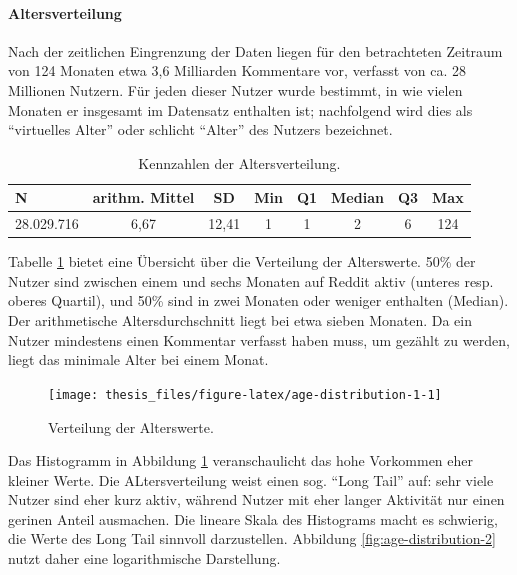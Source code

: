 \documentclass[11pt,a4paper,twoside]{article}
\let\oldpar\paragraph
\renewcommand{\paragraph}{\oldpar*}
\begin{document}
\hypertarget{altersverteilung}{%
\paragraph{Altersverteilung}\label{altersverteilung}}

Nach der zeitlichen Eingrenzung der Daten liegen für den betrachteten
Zeitraum von 124 Monaten etwa 3,6 Milliarden Kommentare vor, verfasst
von ca. 28 Millionen Nutzern. Für jeden dieser Nutzer wurde bestimmt, in
wie vielen Monaten er insgesamt im Datensatz enthalten ist; nachfolgend
wird dies als \enquote{virtuelles Alter} oder schlicht \enquote{Alter}
des Nutzers bezeichnet.



\begin{table}

\caption{\label{tab:summary-age-tab}Kennzahlen der Altersverteilung.}
\centering
\begin{tabular}[t]{lccccccc}
\toprule
N & arithm. Mittel & SD & Min & Q1 & Median & Q3 & Max\\
\midrule
28.029.716 & 6,67 & 12,41 & 1 & 1 & 2 & 6 & 124\\
\bottomrule
\end{tabular}
\end{table}

Tabelle \ref{tab:summary-age-tab} bietet eine Übersicht über die
Verteilung der Alterswerte. 50\% der Nutzer sind zwischen einem und
sechs Monaten auf Reddit aktiv (unteres resp. oberes Quartil), und 50\%
sind in zwei Monaten oder weniger enthalten (Median). Der arithmetische
Altersdurchschnitt liegt bei etwa sieben Monaten. Da ein Nutzer
mindestens einen Kommentar verfasst haben muss, um gezählt zu werden,
liegt das minimale Alter bei einem Monat.

\begin{figure}

{\centering \texttt{[image: thesis\_files/figure-latex/age-distribution-1-1]} 

}

\caption{Verteilung der Alterswerte.}\label{fig:age-distribution-1}
\end{figure}

Das Histogramm in Abbildung \ref{fig:age-distribution-1} veranschaulicht
das hohe Vorkommen eher kleiner Werte. Die ALtersverteilung weist einen
sog. \enquote{Long Tail} auf: sehr viele Nutzer sind eher kurz aktiv,
während Nutzer mit eher langer Aktivität nur einen gerinen Anteil
ausmachen. Die lineare Skala des Histograms macht es schwierig, die
Werte des Long Tail sinnvoll darzustellen. Abbildung
\ref{fig:age-distribution-2} nutzt daher eine logarithmische
Darstellung.
\end{document}
